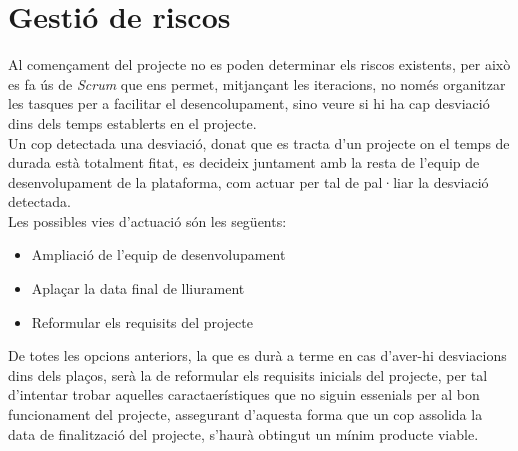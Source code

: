 \section{Gestió de riscos}
Al començament del projecte no es poden determinar els riscos existents, per això es fa ús de \textit{Scrum}\cite{scrum} que ens permet, mitjançant les iteracions, no només organitzar les tasques per a facilitar el desencolupament, sino veure si hi ha cap desviació dins dels temps establerts en el projecte.\\
\newline Un cop detectada una desviació, donat que es tracta d'un projecte on el temps de durada està totalment fitat, es decideix juntament amb la resta de l'equip de desenvolupament de la plataforma, com actuar per tal de pal·liar la desviació detectada.\\
\newline Les possibles vies d'actuació són les següents:
\begin{itemize}
	\item Ampliació de l'equip de desenvolupament
	\item Aplaçar la data final de lliurament
	\item Reformular els requisits del projecte
\end{itemize}
De totes les opcions anteriors, la que es durà a terme en cas d'aver-hi desviacions dins dels plaços, serà la de reformular els requisits inicials del projecte, per tal d'intentar trobar aquelles caractaerístiques que no siguin essenials per al bon funcionament del projecte, assegurant d'aquesta forma que un cop assolida la data de finalització del projecte, s'haurà obtingut un mínim producte viable.
